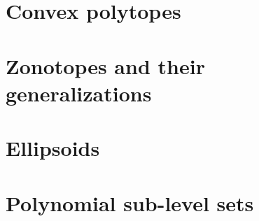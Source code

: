 \section{Convex polytopes}


\section{Zonotopes and their generalizations}


\section{Ellipsoids}


\section{Polynomial sub-level sets}


